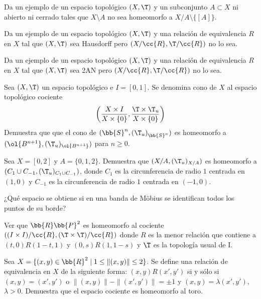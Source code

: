 \begin{ejercicio}
    Da un ejemplo de un espacio topológico $(X,\T)$ y un subconjunto $A \subset X$ ni abierto ni cerrado tales que $X \setminus A$ no sea homeomorfo a $X/A \setminus \{[A]\}$.
\end{ejercicio}

\begin{ejercicio}
    Da un ejemplo de un espacio topológico $(X,\T)$ y una relación de equivalencia $R$ en $X$ tal que $(X,\T)$ sea Hausdorff pero $(X/\cc{R}, \T/\cc{R})$ no lo sea.
\end{ejercicio}

\begin{ejercicio}
    Da un ejemplo de un espacio topológico $(X,\T)$ y una relación de equivalencia $R$ en $X$ tal que $(X,\T)$ sea 2AN pero $(X/\cc{R}, \T /\cc{R})$ no lo sea.
\end{ejercicio}

\begin{ejercicio}
    Sea $(X,\T)$ un espacio topológico e $I = [0, 1]$. Se denomina cono de $X$ al espacio topológico cociente
    \begin{equation*}
        \left(\frac{X\times I}{X\times \{0\}},\frac{\T \times \T_u}{X\times \{0\}}\right)
    \end{equation*}
    Demuestra que que el cono de $(\bb{S}^n,{(\T_u)}_{\bb{S}^n})$ es homeomorfo a $(\ol{B^{n+1}},(\T_u)_{\ol{B^{n+1}}})$ para $n \geq 0$.
\end{ejercicio}

\begin{ejercicio}
    Sea $X = [0, 2]$ y $A = \{0, 1, 2\}$. Demuestra que $(X/A,(\T_u)_{X/A})$ es homeomorfo a $(C_1 \cup C_{-1},(\T_u)_{C_1 \cup C_{-1}})$, donde $C_1$ es la circunferencia de radio $1$ centrada en $(1, 0)$ y $C_{-1}$ es la circunferencia de radio $1$ centrada en $(-1, 0)$.
\end{ejercicio}

\begin{ejercicio}
    ¿Qué espacio se obtiene si en una banda de Möbius se identifican todos los puntos de su borde?
\end{ejercicio}

\begin{ejercicio}
    Ver que $\bb{R}\bb{P}^2$ es homeomorfo al cociente $((I \times I)/\cc{R},(\T \times \T )/\cc{R})$ donde $R$ es la menor relación que contiene a $(t, 0)R(1 - t, 1)$ y $(0, s)R(1, 1 - s)$ y $\T$ es la topología usual de I.
\end{ejercicio}

\begin{ejercicio}
    Sea $X = \{(x, y) \in \bb{R}^2\mid 1 \leq \|(x, y)\| \leq 2\}$. Se define una relación de equivalencia en $X$ de la siguiente forma: $(x, y)R(x', y')$ si y sólo si $(x, y) = (x', y')$ o $\|(x, y)\| - \|(x', y')\| = \pm 1$ y $(x, y) = \lambda(x', y')$, $\lambda > 0$. Demuestra que el espacio cociente es homeomorfo al toro.
\end{ejercicio}